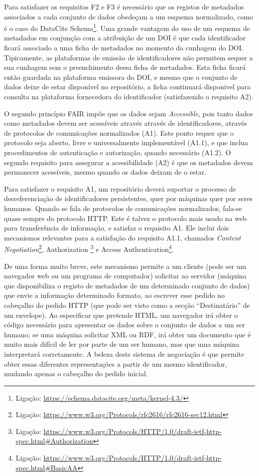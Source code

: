 \documentclass[sigconf,nonacm]{acmart}
\begin{document}
Para satisfazer os requisitos F2 e F3 é necessário que os registos de metadados associados a cada conjunto de dados obedeçam a um esquema normalizado, como é o caso do DataCite Schema\footnote{Ligação: \url{https://schema.datacite.org/meta/kernel-4.3/}}. Uma grande vantagem do uso de um esquema de metadados em conjunção com a atribuição de um DOI é que cada identificador ficará associado a uma ficha de metadados no momento da cunhagem do \gls{DOI}. Tipicamente, as plataformas de emissão de identificadores não permitem sequer a sua cunhagem sem o preenchimento dessa ficha de metadados. Esta ficha ficará então guardada na plataforma emissora do \gls{DOI}, e mesmo que o conjunto de dados deixe de estar disponível no repositório, a ficha continuará disponivel para consulta na plataforma fornecedora do identificador (satisfazendo o requisito A2).

O segundo princípio \gls{FAIR} impõe que os dados sejam \emph{Accessible}, pois tanto dados como metadados devem ser acessíveis através através de identificadores, através de protocolos de comunicações normalizados (A1). Este ponto requer que o protocolo seja aberto, livre e universalmente implementável (A1.1), e que inclua procedimentos de autenticação e autorização, quando necessário (A1.2). O segundo requisito para assegurar a acessibilidade (A2) é que os metadados devem permanecer acessíveis, mesmo quando os dados deixam de o estar.

Para satisfazer o requisito A1, um repositório deverá suportar o processo de desreferenciação de identificadores persistentes, quer por máquinas quer por seres humanos. Quando se fala de protocolos de comunicações normalizados, fala-se quase sempre do protocolo \gls{HTTP}. Este é talvez o protocolo mais usado na web para transferência de informação, e satisfaz o requisito A1. Ele inclui dois mecanismos relevantes para a satisfação do requisito A1.1, chamados \emph{Content Negotiation}\footnote{Ligação: \url{https://www.w3.org/Protocols/rfc2616/rfc2616-sec12.html}}, Authorization \footnote{Ligação: \url{https://www.w3.org/Protocols/HTTP/1.0/draft-ietf-http-spec.html\#Authorization}} e Access Authentication\footnote{Ligação: \url{https://www.w3.org/Protocols/HTTP/1.0/draft-ietf-http-spec.html\#BasicAA}}.

De uma forma muito breve, este mecanismo permite a um cliente (pode ser um navegador web ou um programa de computador) solicitar ao servidor (máquina que disponibiliza o registo de metadados de um determinado conjunto de dados) que envie a informação determinado formato, ao escrever esse pedido no cabeçalho do pedido \gls{HTTP} (que pode ser visto como a secção ``Destinatário'' de um envelope). Ao especificar que pretende \gls{HTML}, um navegador irá obter o código necessário para apresentar os dados sobre o conjunto de dados a um ser humano; se uma máquina solicitar \gls{XML} ou \gls{RDF}, irá obter um documento que é muito mais difícil de ler por parte de um ser humano, mas que uma máquina interpretará corretamente. A beleza deste sistema de negociação é que permite obter essas diferentes representações a partir de um mesmo identificador, mudando apenas o cabeçalho do pedido inicial.
\end{document}
